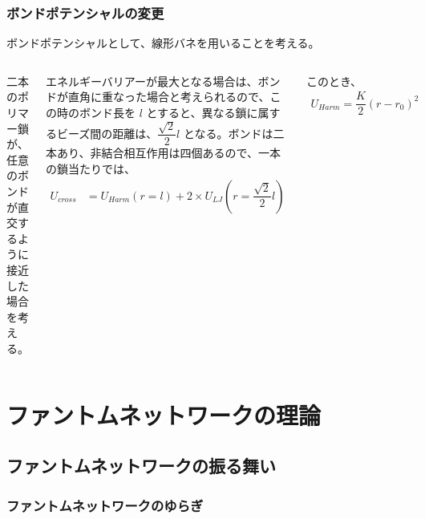 \documentclass[11pt, dvipdfmx]{beamer}
\begin{document}
\begin{appendix}
\begin{frame}
\end{frame}

\begin{frame}
\frametitle{ボンドポテンシャルの変更}

ボンドポテンシャルとして、線形バネを用いることを考える。

\scriptsize
\begin{columns}[totalwidth=1\textwidth]
二本のポリマー鎖が、任意のボンドが直交するように接近した場合を考える。

エネルギーバリアーが最大となる場合は、ボンドが直角に重なった場合と考えられるので、この時のボンド長を $l$ とすると、異なる鎖に属するビーズ間の距離は、$\dfrac{\sqrt{2}}{2}l$ となる。ボンドは二本あり、非結合相互作用は四個あるので、一本の鎖当たりでは、
\tiny
\begin{align*}
U_{cross}
	&=U_{Harm}(r=l) +  2\times U_{LJ}(r=\dfrac{\sqrt{2}}{2}l)
\end{align*}

このとき、
\begin{align*}
U_{Harm} = \dfrac{K}{2}(r-r_0)^2 
\end{align*}

\begin{figure}
\centering
\includegraphics[width=50mm]{./fig/Cross_Harm_LJ.pdf}
\end{figure}
\end{columns}

\end{frame}

\section{ファントムネットワークの理論}
\subsection{ファントムネットワークの振る舞い}
\begin{frame}
\frametitle{ファントムネットワークのゆらぎ}


\end{frame}
\end{appendix}
\end{document}

